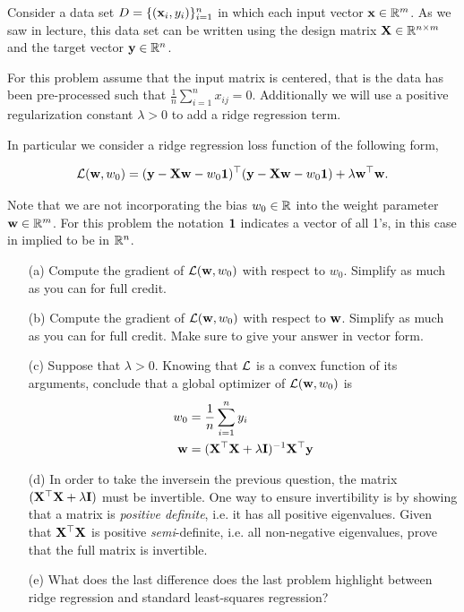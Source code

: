 \documentclass[submit]{harvardml}
\begin{document}
\begin{problem}

  Consider a data set $D = \{(\mathbf{x}_i, y_i)\}_{i=1}^n$ in which each
  input vector $\mathbf{x} \in \mathbb{R}^m$. As we saw in lecture, this
  data set can be written using the design matrix $\mathbf{X} \in
  \mathbb{R}^{n \times m}$ and the target vector $\mathbf{y} \in \mathbb{R}^n$.
  
  
  For this problem assume that the input matrix is centered, that is
  the data has been pre-processed such that $\frac{1}{n} \sum_{i=1}^n
  x_{ij} = 0 $.  Additionally we will use a positive regularization
  constant $\lambda > 0$ to add a ridge regression term.

  In particular we consider a ridge regression loss function of the following form,

\[\mathcal{L}(\mathbf{w}, w_0) = (\mathbf{y} - \mathbf{X} \mathbf{w} - w_0 {\bf 1 })^\top (\mathbf{y} - \mathbf{X}
\mathbf{w} - w_0 {\bf 1 }) + \lambda \mathbf{w}^\top \mathbf{w} .\]

 Note that we are not incorporating the bias $w_0\in \mathbb{R}$ into the weight parameter $\mathbf{w} \in \mathbb{R}^m$.
 For this problem the notation ${\bf 1}$ indicates a vector of all 1's, in this case in implied to be in $\mathbb{R}^n$.  


\begin{itemize}
  \item[(a)] Compute the gradient of $\mathcal{L}(\mathbf{w}, w_0)$ with respect to $w_0$.
    Simplify as much as you can for full credit.
  \item[(b)] Compute the gradient of $\mathcal{L}(\mathbf{w}, w_0)$ with respect to $\mathbf{w}$.
    Simplify as much as you can for full credit. Make sure to give your answer
    in vector form.
  \item[(c)] Suppose that $\lambda > 0$. Knowing that $\mathcal{L}$ is a convex function
    of its arguments, conclude that a global optimizer of
    $\mathcal{L}(\mathbf{w}, w_0)$ is
    \begin{align}
      w_0 &= \frac{1}{n} \sum_{i=1}^n y_i \\
      \mathbf{w} &= (\mathbf{X}^\top \mathbf{X} + \lambda \mathbf{I})^{-1} \mathbf{X}^\top \mathbf{y}
    \end{align}
  \item[(d)] In order to take the inversein the previous question, the
    matrix $(\mathbf{X}^\top \mathbf{X} + \lambda \mathbf{I})$ must be invertible.
    One way to ensure invertibility is by showing that a matrix is
    \textit{positive definite}, i.e. it has all positive
    eigenvalues. Given that $\mathbf{X}^\top\mathbf{X}$ is positive
    \textit{semi}-definite, i.e.  all non-negative eigenvalues, prove that the
    full matrix is invertible.

  \item[(e)] What does the last difference does the last problem  highlight between ridge regression
    and standard least-squares regression?
    

\end{itemize}
\end{problem}
\end{document}
